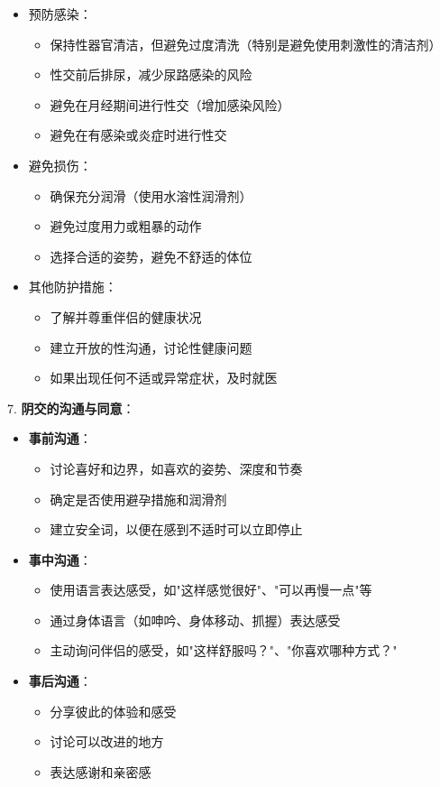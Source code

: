 \documentclass[12pt,UTF8]{ctexbook}
\begin{document}
\begin{itemize}
\begin{itemize}
\begin{itemize}
			\item 使用有效的避孕措施（避孕套、避孕药、避孕环、避孕贴等）
			\item 了解并正确使用紧急避孕措施（在无保护性交后72小时内使用）
			\item 考虑长期避孕方法（如宫内节育器、皮下埋植等）
		\end{itemize}
		\item 预防感染：
		\begin{itemize}
			\item 保持性器官清洁，但避免过度清洗（特别是避免使用刺激性的清洁剂）
			\item 性交前后排尿，减少尿路感染的风险
			\item 避免在月经期间进行性交（增加感染风险）
			\item 避免在有感染或炎症时进行性交
		\end{itemize}
		\item 避免损伤：
		\begin{itemize}
			\item 确保充分润滑（使用水溶性润滑剂）
			\item 避免过度用力或粗暴的动作
			\item 选择合适的姿势，避免不舒适的体位
		\end{itemize}
		\item 其他防护措施：
		\begin{itemize}
			\item 了解并尊重伴侣的健康状况
			\item 建立开放的性沟通，讨论性健康问题
			\item 如果出现任何不适或异常症状，及时就医
		\end{itemize}
	\end{itemize}
\end{itemize}

7. \textbf{阴交的沟通与同意}：
\begin{itemize}
	\item \textbf{事前沟通}：
	\begin{itemize}
		\item 讨论喜好和边界，如喜欢的姿势、深度和节奏
		\item 确定是否使用避孕措施和润滑剂
		\item 建立安全词，以便在感到不适时可以立即停止
	\end{itemize}
	\item \textbf{事中沟通}：
	\begin{itemize}
		\item 使用语言表达感受，如"这样感觉很好"、"可以再慢一点"等
		\item 通过身体语言（如呻吟、身体移动、抓握）表达感受
		\item 主动询问伴侣的感受，如"这样舒服吗？"、"你喜欢哪种方式？"
	\end{itemize}
	\item \textbf{事后沟通}：
	\begin{itemize}
		\item 分享彼此的体验和感受
		\item 讨论可以改进的地方
		\item 表达感谢和亲密感
	\end{itemize}
\end{itemize}
\end{document}
